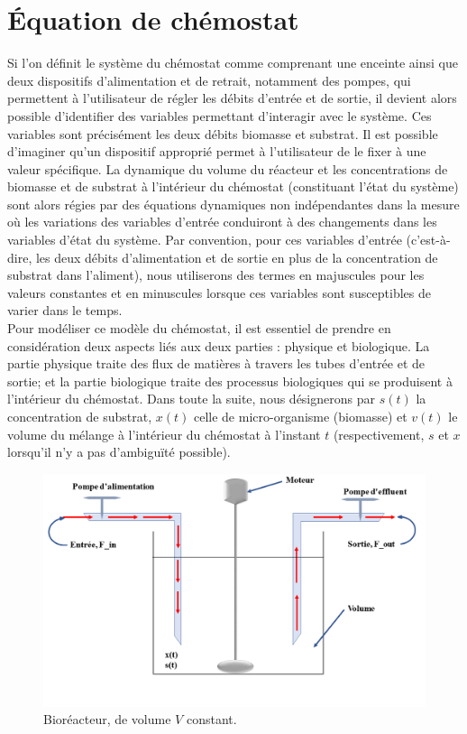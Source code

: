 \documentclass[12pt,a4paper]{report}%
\begin{document}
\section{Équation de chémostat}
Si l'on définit le système du chémostat comme comprenant une enceinte ainsi que deux dispositifs d'alimentation et de retrait, notamment des pompes, qui permettent à l'utilisateur de régler les débits d'entrée et de sortie, il devient alors possible d'identifier des variables permettant d'interagir avec le système. Ces variables sont précisément les deux débits biomasse et substrat. Il est possible d'imaginer qu'un dispositif approprié permet à l'utilisateur de le fixer à une valeur spécifique. La dynamique du volume du réacteur et les concentrations de biomasse et de substrat à l'intérieur du chémostat (constituant l'état du système) sont alors régies par des équations dynamiques non indépendantes dans la mesure où les variations des variables d'entrée conduiront à des changements dans les variables d'état du système. Par convention, pour ces variables d'entrée (c'est-à-dire, les deux débits d'alimentation et de sortie en plus de la concentration de substrat dans l'aliment), nous utiliserons des termes en majuscules pour les valeurs constantes et en minuscules lorsque ces variables sont susceptibles de varier dans le temps.\\
Pour modéliser ce modèle du chémostat, il est essentiel de prendre en considération deux aspects liés aux deux parties : physique et biologique. La partie physique traite des flux de matières à travers les tubes d'entrée et de sortie; et la partie biologique traite des processus biologiques qui se produisent à l'intérieur du chémostat. Dans toute la suite, nous désignerons par $s(t)$ la concentration de substrat, $x(t)$ celle de micro-organisme (biomasse) et $v(t)$ le volume du mélange à l'intérieur du chémostat à l'instant $t$ (respectivement, $s$ et $x$ lorsqu'il n'y a pas d'ambiguïté possible).

\begin{figure}[h]
    \centering
    \includegraphics[width=1.05\textwidth]{moha.png} 
    \caption{Bioréacteur, de volume $V$ constant.}
    \label{fig:votre_label}
\end{figure}
\end{document}
